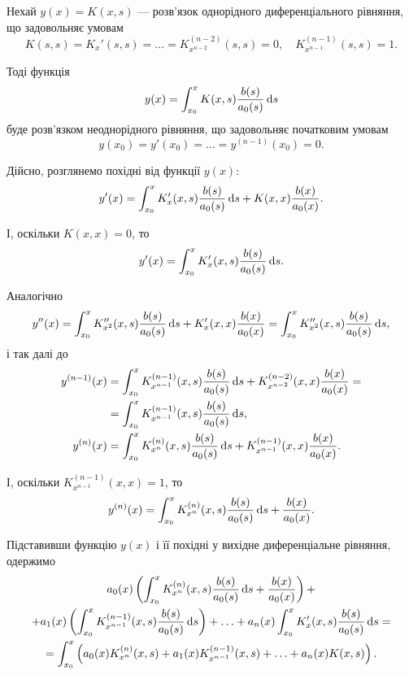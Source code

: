 Нехай $y(x) = K(x, s)$ --- розв'язок однорідного диференціального рівняння, що задовольняє умовам
\begin{equation*}
	K(s, s) = K_x'(s, s) = \ldots = K_{x^{n - 2}}^{(n - 2)}(s, s) = 0, \quad K_{x^{n - 1}}^{(n - 1)}(s, s) = 1.
\end{equation*}

Тоді функція
\begin{equation*}
	y(x) = \int_{x_0}^x K(x, s) \frac{b(s)}{a_0(s)} \mathop{}\!\mathrm{d} s
\end{equation*}
буде розв'язком неоднорідного рівняння, що задовольняє початковим умовам
\begin{equation*}
	y(x_0) = y'(x_0) = \ldots = y^{(n - 1)}(x_0) = 0.
\end{equation*}

Дійсно, розглянемо похідні від функції $y(x)$:
\begin{equation*}
	y'(x) = \int_{x_0}^x K_x'(x, s) \frac{b(s)}{a_0(s)} \mathop{}\!\mathrm{d} s + K(x, x) \frac{b(x)}{a_0(x)}.
\end{equation*}

І, оскільки $K(x, x) = 0$, то
\begin{equation*}
	y'(x) = \int_{x_0}^x K_x'(x, s) \frac{b(s)}{a_0(s)} \mathop{}\!\mathrm{d} s.
\end{equation*}

Аналогічно
\begin{equation*}
	y''(x) = \int_{x_0}^x K_{x^2}''(x, s) \frac{b(s)}{a_0(s)} \mathop{}\!\mathrm{d} s + K_x'(x, x) \frac{b(x)}{a_0(x)} = \int_{x_0}^x K_{x^2}''(x, s) \frac{b(s)}{a_0(s)} \mathop{}\!\mathrm{d} s,
\end{equation*}
і так далі до
\begin{align*}
	y^{(n - 1)}(x) &= \int_{x_0}^x K_{x^{n - 1}}^{(n - 1)}(x, s) \frac{b(s)}{a_0(s)} \mathop{}\!\mathrm{d} s + K_{x^{n - 2}}^{(n - 2)}(x, x) \frac{b(x)}{a_0(x)} = \\ &= \int_{x_0}^x K_{x^{n - 1}}^{(n - 1)}(x, s) \frac{b(s)}{a_0(s)} \mathop{}\!\mathrm{d} s, \\
	y^{(n)}(x) &= \int_{x_0}^x K_{x^n}^{(n)}(x, s) \frac{b(s)}{a_0(s)} \mathop{}\!\mathrm{d} s + K_{x^{n - 1}}^{(n - 1)}(x, x) \frac{b(x)}{a_0(x)}.
\end{align*}

І, оскільки $K_{x^{n - 1}}^{(n - 1)}(x, x) = 1$, то
\begin{equation*}
	y^{(n)}(x) = \int_{x_0}^x K_{x^n}^{(n)}(x, s) \frac{b(s)}{a_0(s)} \mathop{}\!\mathrm{d} s + \frac{b(x)}{a_0(x)}.
\end{equation*}

Підставивши функцію $y(x)$ і її похідні у вихідне диференціальне рівняння, одержимо
\begin{multline*}
	a_0(x) \left( \int_{x_0}^x K_{x^n}^{(n)} (x, s) \frac{b(s)}{a_0(s)} \mathop{}\!\mathrm{d} s + \frac{b(x)}{a_0(x)} \right) + \\ + a_1(x) \left( \int_{x_0}^x K_{x^{n - 1}}^{(n - 1)} (x, s) \frac{b(s)}{a_0(s)} \mathop{}\!\mathrm{d} s \right) + \ldots + a_n(x) \int_{x_0}^x K_x' (x, s)  \frac{b(s)}{a_0(s)} \mathop{}\!\mathrm{d} s = \\ = \int_{x_0}^x \left( a_0(x) K_{x^n}^{(n)}(x, s) + a_1(x) K_{x^{n - 1}}^{(n - 1)}(x, s) + \ldots + a_n(x) K(x, s) \right).
\end{multline*}

